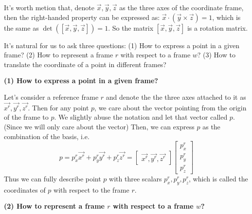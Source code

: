 \documentclass[
]{book}
\theoremstyle{definition}
\theoremstyle{definition}
\theoremstyle{definition}
\theoremstyle{definition}
\theoremstyle{remark}
\begin{document}
It's worth metion that, denote \(\vec{x},\vec{y},\vec{z}\) as the three axes of the coordinate frame, then the right-handed property can be expressed as: \(\vec{x}\cdot(\vec{y}\times \vec{z}) = 1\), which is the same as \(\det ([\vec{x},\vec{y},\vec{z}]) = 1\). So the matrix \([\vec{x},\vec{y},\vec{z}]\) is a rotation matrix.

It's natural for us to ask three questions: (1) How to express a point in a given frame? (2) How to represent a frame \(r\) with respect to a frame \(w\)? (3) How to translate the coordinate of a point in different frames?

\textbf{(1) How to express a point in a given frame?}

Let's consider a reference frame \(r\) and denote the the three axes attached to it as \(\vec{x^r},\vec{y^r},\vec{z^r}\). Then for any point \(p\), we care about the vector pointing from the origin of the frame to \(p\). We slightly abuse the notation and let that vector called \(p\).(Since we will only care about the vector) Then, we can express \(p\) as the combination of the basis, i.e.~\[p = p^r_x \vec{x^r}+p^r_y\vec{y^r}+p^r_z\vec{z^r} = \begin{bmatrix} \vec{x^r},\vec{y^r},\vec{z^r}\end{bmatrix} \begin{bmatrix} p^r_x\\p^r_y\\p^r_z \end{bmatrix}\] Thus we can fully describe point \(p\) with three scalars \(p^r_x,p^r_y,p^r_z\), which is called the coordinates of \(p\) with respect to the frame \(r\).

\textbf{(2) How to represent a frame \(r\) with respect to a frame \(w\)?}
\end{document}
